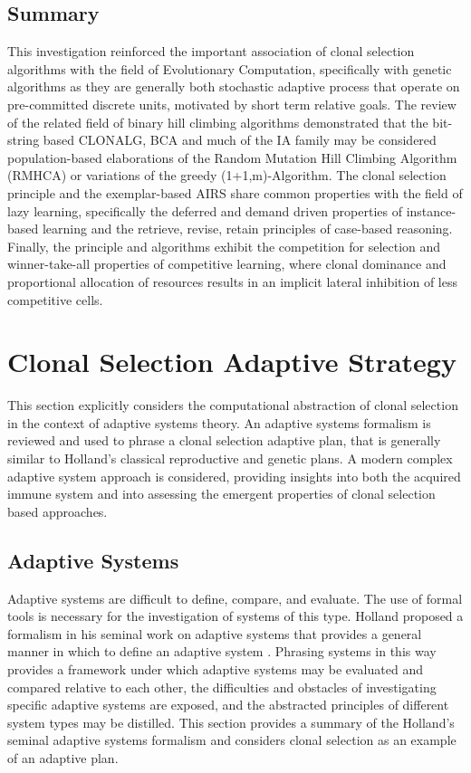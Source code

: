%
%
\subsection{Summary}
This investigation reinforced the important association of clonal selection algorithms with the field of Evolutionary Computation, specifically with genetic algorithms as they are generally both stochastic adaptive process that operate on pre-committed discrete units, motivated by short term relative goals.
The review of the related field of binary hill climbing algorithms demonstrated that the bit-string based CLONALG, BCA and much of the IA family may be considered population-based elaborations of the Random Mutation Hill Climbing Algorithm (RMHCA) or variations of the greedy (1+1,m)-Algorithm.
The clonal selection principle and the exemplar-based AIRS share common properties with the field of lazy learning, specifically the deferred and demand driven properties of instance-based learning and the retrieve, revise, retain principles of case-based reasoning. 
Finally, the principle and algorithms exhibit the competition for selection and winner-take-all properties of competitive learning, where clonal dominance and proportional allocation of resources results in an implicit lateral inhibition of less competitive cells.

%
%
\section{Clonal Selection Adaptive Strategy}
\label{sec:cs:adaptive}
This section explicitly considers the computational abstraction of clonal selection in the context of adaptive systems theory. 
An adaptive systems formalism is reviewed and used to phrase a clonal selection adaptive plan, that is generally similar to Holland's classical reproductive and genetic plans. A modern complex adaptive system approach is considered, providing insights into both the acquired immune system and into assessing the emergent properties of clonal selection based approaches.

%
%
\subsection{Adaptive Systems}
\label{subsec:cs:adaptive}
Adaptive systems are difficult to define, compare, and evaluate. The use of formal tools is necessary for the investigation of systems of this type. Holland proposed a formalism in his seminal work on adaptive systems that provides a general manner in which to define an adaptive system \cite{Holland1992}. Phrasing systems in this way provides a framework under which adaptive systems may be evaluated and compared relative to each other, the difficulties and obstacles of investigating specific adaptive systems are exposed, and the abstracted principles of different system types may be distilled. This section provides a summary of the Holland's seminal adaptive systems formalism and considers clonal selection as an example of an adaptive plan.

